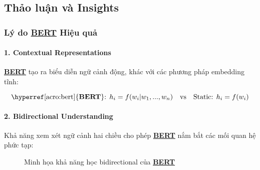     \subsection{Thảo luận và Insights}
    \label{ssec:thao_luan}
    
    \subsubsection{Lý do \hyperref[acro:bert]{\textbf{BERT}} Hiệu quả}
    
    \paragraph{1.
    Contextual Representations}
    \hyperref[acro:bert]{\textbf{BERT}} tạo ra biểu diễn ngữ cảnh động, khác với các phương pháp embedding tĩnh:
    
    \begin{equation}
    \text{\hyperref[acro:bert]{\textbf{BERT}}: } h_i = f(w_i | w_1, ..., w_n) \quad \text{vs} \quad \text{Static: } h_i = f(w_i)
    \end{equation}
    
    \paragraph{2.
    Bidirectional Understanding}
    Khả năng xem xét ngữ cảnh hai chiều cho phép \hyperref[acro:bert]{\textbf{BERT}} nắm bắt các mối quan hệ phức tạp:
    
    \begin{figure}[H]
    \centering
    \caption{Minh họa khả năng học bidirectional của \hyperref[acro:bert]{\textbf{BERT}}}
    \label{fig:bidirectional}
    \end{figure}
    
